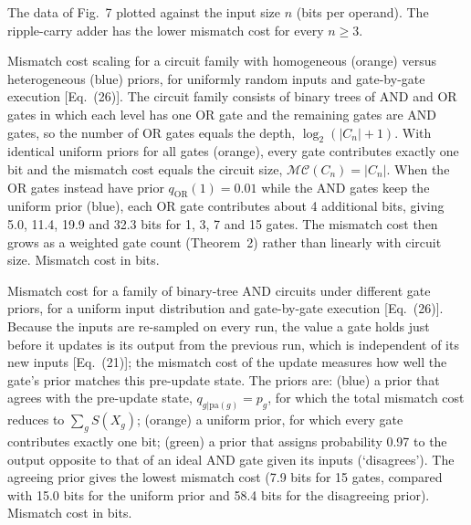\caption{The data of Fig.~7 plotted against the input size $n$ (bits per operand). The
ripple-carry adder has the lower mismatch cost for every $n \ge 3$.}

\caption{Mismatch cost scaling for a circuit family with homogeneous (orange) versus
heterogeneous (blue) priors, for uniformly random inputs and gate-by-gate execution
[Eq.~(26)]. The circuit family consists of binary trees of AND and OR gates in which each
level has one OR gate and the remaining gates are AND gates, so the number of OR gates
equals the depth, $\log_2(|C_n| + 1)$. With identical uniform priors for all gates
(orange), every gate contributes exactly one bit and the mismatch cost equals the circuit
size, $\mathcal{MC}(C_n) = |C_n|$. When the OR gates instead have prior
$q_{\mathrm{OR}}(1) = 0.01$ while the AND gates keep the uniform prior (blue), each OR
gate contributes about 4 additional bits, giving 5.0, 11.4, 19.9 and 32.3 bits for
1, 3, 7 and 15 gates. The mismatch cost then grows as a weighted gate count
(Theorem~2) rather than linearly with circuit size. Mismatch cost in bits.}

\caption{Mismatch cost for a family of binary-tree AND circuits under different gate
priors, for a uniform input distribution and gate-by-gate execution [Eq.~(26)].
Because the inputs are re-sampled on every run, the value a gate holds just before it
updates is its output from the previous run, which is independent of its new inputs
[Eq.~(21)]; the mismatch cost of the update measures how well the gate's prior matches
this pre-update state. The priors are: (blue) a prior that agrees with the pre-update
state, $q_{g|\mathrm{pa}(g)} = p_g$, for which the total mismatch cost reduces to
$\sum_g S(X_g)$; (orange) a uniform prior, for which every gate contributes exactly one
bit; (green) a prior that assigns probability 0.97 to the output opposite to that of an
ideal AND gate given its inputs (`disagrees'). The agreeing prior gives the lowest
mismatch cost (7.9 bits for 15 gates, compared with 15.0 bits for the uniform prior and
58.4 bits for the disagreeing prior). Mismatch cost in bits.}

